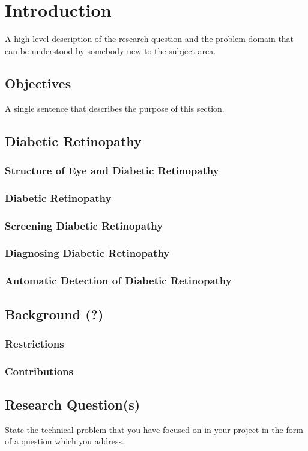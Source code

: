 \chapter{Introduction}
\label{intro}

A high level description of the research question and the problem domain that can be understood by somebody new to the subject area.

\section{Objectives}
A single sentence that describes the purpose of this section.
\section{Diabetic Retinopathy}
\subsection{Structure of Eye and Diabetic Retinopathy}
\subsection{Diabetic Retinopathy}
\subsection{Screening Diabetic Retinopathy}
\subsection{Diagnosing Diabetic Retinopathy}
\subsection{Automatic Detection of Diabetic Retinopathy}
\section{Background (?)}
\subsection{Restrictions}
\subsection{Contributions}
\section{Research Question(s)}
State the technical problem that you have focused on in your project in the form of a question which you address.
